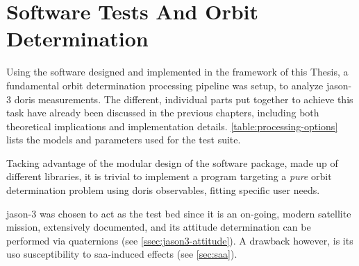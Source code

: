 \section{Software Tests And Orbit Determination}\label{sec:jason3-pod}

Using the software designed and implemented in the framework of this Thesis, a fundamental 
orbit determination processing pipeline was setup, to analyze \gls{jason}-3 
\gls{doris} measurements. The different, individual parts put together to achieve 
this task have already been discussed in the previous chapters, including both 
theoretical implications and implementation details. \autoref{table:processing-options} 
lists the models and parameters used for the test suite.

Tacking advantage of the modular design of the software package, made up of different 
libraries, it is trivial to implement a program targeting a \emph{pure} orbit determination 
problem using \gls{doris} observables, fitting specific user needs. 
 
\gls{jason}-3 was chosen 
to act as the test bed since it is an on-going, modern satellite mission, extensively 
documented, and its attitude determination can be performed via quaternions 
(see \autoref{ssec:jason3-attitude}). A drawback however, is its \gls{uso} susceptibility 
to \gls{saa}-induced effects (see \autoref{sec:saa}).


